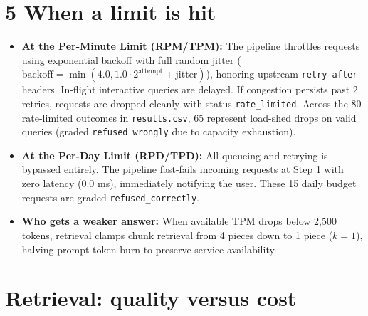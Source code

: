 \documentclass[8.5pt,a4paper]{article}
\begin{document}
\section*{5 When a limit is hit}
\begin{itemize}
    \item \textbf{At the Per-Minute Limit (RPM/TPM):} The pipeline throttles requests using exponential backoff with full random jitter ($\text{backoff}=\min(4.0,1.0\cdot 2^{\text{attempt}}+\text{jitter})$), honoring upstream \texttt{retry-after} headers. In-flight interactive queries are delayed. If congestion persists past 2 retries, requests are dropped cleanly with status \texttt{rate\_limited}. Across the 80 rate-limited outcomes in \texttt{results.csv}, 65 represent load-shed drops on valid queries (graded \texttt{refused\_wrongly} due to capacity exhaustion).
    \item \textbf{At the Per-Day Limit (RPD/TPD):} All queueing and retrying is bypassed entirely. The pipeline fast-fails incoming requests at Step 1 with zero latency (0.0 ms), immediately notifying the user. These 15 daily budget requests are graded \texttt{refused\_correctly}.
    \item \textbf{Who gets a weaker answer:} When available TPM drops below 2,500 tokens, retrieval clamps chunk retrieval from 4 pieces down to 1 piece ($k=1$), halving prompt token burn to preserve service availability.
\end{itemize}

\section*{Retrieval: quality versus cost}
\end{document}
